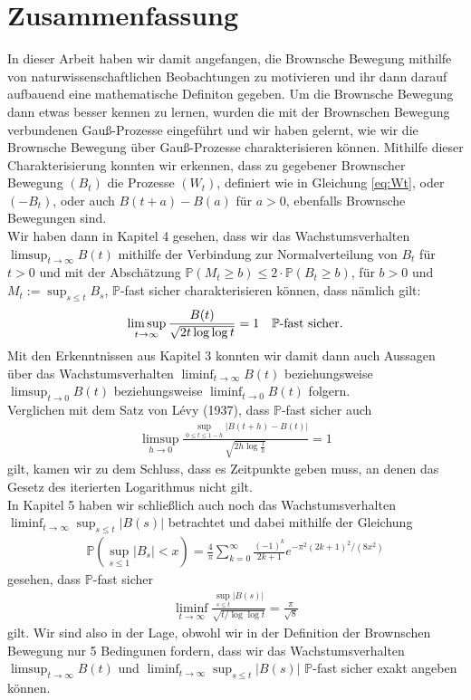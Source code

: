 \documentclass[12pt,a4paper]{scrartcl}
\numberwithin{equation}{section}
\numberwithin{equation}{section}%
\theoremstyle{definition}
\begin{document}
\newpage
\section{Zusammenfassung}
\noindent In dieser Arbeit haben wir damit angefangen, die Brownsche Bewegung mithilfe von naturwissenschaftlichen Beobachtungen zu motivieren und ihr dann darauf aufbauend eine mathematische Definiton gegeben.
Um die Brownsche Bewegung dann etwas besser kennen zu lernen, wurden die mit der Brownschen Bewegung verbundenen Gauß-Prozesse eingeführt und wir haben gelernt, wie wir die Brownsche Bewegung über Gauß-Prozesse charakterisieren können.
Mithilfe dieser Charakterisierung konnten wir erkennen, dass zu gegebener Brownscher Bewegung $(B_t)$ die Prozesse $(W_t)$, definiert wie in Gleichung \eqref{eq:Wt}, oder $(-B_t)$, oder auch $B(t+a)-B(a)$ für $a>0$, ebenfalls Brownsche Bewegungen sind.\\
Wir haben dann in Kapitel 4 gesehen, dass wir das Wachstumsverhalten $\limsup_{t\to\infty} B(t)$  mithilfe der Verbindung zur Normalverteilung von $B_t$ für $t>0$ und mit der Abschätzung $\mathbb{P} (M_t \geq b ) \leq 2\cdot \mathbb{P} (B_t \geq b)$, für $b>0$ und $M_t:=\sup_{s\leq t} B_s$, $\mathbb{P}$-fast sicher charakterisieren können, dass nämlich gilt:
\begin{equation*}
\limsup_{t\to\infty} \frac{B(t)}{\sqrt{2t\log\log t}} = 1 \text{\quad} \mathbb{P} \text{-fast sicher.}
\end{equation*}
Mit den Erkenntnissen aus Kapitel 3 konnten wir damit dann auch Aussagen über das Wachstumsverhalten $\liminf_{t\to\infty} B(t)$ beziehungsweise $\limsup_{t\to 0} B(t)$
beziehungsweise $\liminf_{t\to 0} B(t)$ folgern.\\
Verglichen mit dem Satz von Lévy (1937), dass $\mathbb{P}$-fast sicher auch
\begin{align*}
\limsup\limits_{h\to0} \frac{\sup_{0\leq t\leq 1-h} \vert B(t+h)-B(t)\vert}{\sqrt{2h\log\frac{1}{h}}} = 1
\end{align*}
gilt, kamen wir zu dem Schluss, dass es Zeitpunkte geben muss, an denen das Gesetz des iterierten Logarithmus nicht gilt.\\
In Kapitel 5 haben wir schließlich auch noch das Wachstumsverhalten\\
$\liminf_{t\to\infty} \sup_{s\leq t} \vert B(s) \vert$ betrachtet und dabei mithilfe der Gleichung 
\begin{align*}
\mathbb{P}\left( \sup\limits_{s\leq 1} \vert B_s \vert < x \right) = \frac{4}{\pi}\sum_{k=0}^{\infty} \frac{(-1)^k}{2k+1} e^{-\pi^2(2k+1)^2/(8x^2)}
\end{align*}
gesehen, dass $\mathbb{P}$-fast sicher
\begin{align*}
\liminf\limits_{t\to\infty} \frac{\sup_{s\leq t}\vert B(s)\vert}{\sqrt{t/\log\log t}} = \frac{\pi}{\sqrt{8}}
\end{align*}
gilt.
Wir sind also in der Lage, obwohl wir in der Definition der Brownschen Bewegung nur 5 Bedingunen fordern, dass wir das Wachstumsverhalten $\limsup_{t\to\infty} B(t)$ und \linebreak$\liminf_{t \to \infty} \sup_{s\leq t} \vert B(s) \vert$ $\mathbb{P}$-fast sicher exakt angeben können.
\end{document}
